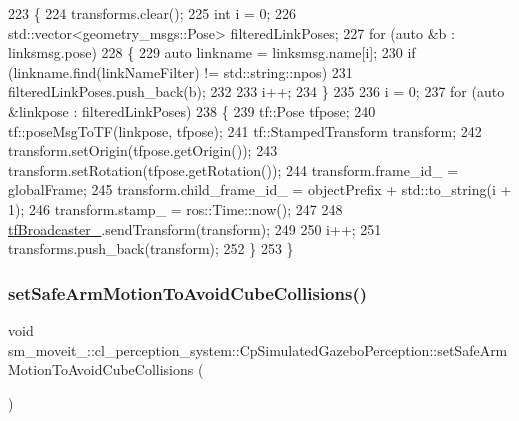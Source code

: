 \begin{DoxyCode}
223             \{
224                 transforms.clear();
225                 \textcolor{keywordtype}{int} i = 0;
226                 std::vector<geometry\_msgs::Pose> filteredLinkPoses;
227                 \textcolor{keywordflow}{for} (\textcolor{keyword}{auto} &b : linksmsg.pose)
228                 \{
229                     \textcolor{keyword}{auto} linkname = linksmsg.name[i];
230                     \textcolor{keywordflow}{if} (linkname.find(linkNameFilter) != std::string::npos)
231                         filteredLinkPoses.push\_back(b);
232 
233                     i++;
234                 \}
235 
236                 i = 0;
237                 \textcolor{keywordflow}{for} (\textcolor{keyword}{auto} &linkpose : filteredLinkPoses)
238                 \{
239                     tf::Pose tfpose;
240                     tf::poseMsgToTF(linkpose, tfpose);
241                     tf::StampedTransform transform;
242                     transform.setOrigin(tfpose.getOrigin());
243                     transform.setRotation(tfpose.getRotation());
244                     transform.frame\_id\_ = globalFrame;
245                     transform.child\_frame\_id\_ = objectPrefix + std::to\_string(i + 1);
246                     transform.stamp\_ = ros::Time::now();
247 
248                     \hyperlink{classsm__moveit__4_1_1cl__perception__system_1_1CpSimulatedGazeboPerception_a413594aa743f273c844795ff9f2f724b}{tfBroadcaster\_}.sendTransform(transform);
249 
250                     i++;
251                     transforms.push\_back(transform);
252                 \}
253             \}
\end{DoxyCode}
\mbox{\label{classsm__moveit__4_1_1cl__perception__system_1_1CpSimulatedGazeboPerception_af42b5a4e239fcac98a222c34115c9bc0}} 
\subsubsection{\texorpdfstring{set\+Safe\+Arm\+Motion\+To\+Avoid\+Cube\+Collisions()}{setSafeArmMotionToAvoidCubeCollisions()}}
{\footnotesize\ttfamily void sm\+\_\+moveit\+\_\+::cl\+\_\+perception\+\_\+system\+::\+Cp\+Simulated\+Gazebo\+Perception\+::set\+Safe\+Arm\+Motion\+To\+Avoid\+Cube\+Collisions (\begin{DoxyParamCaption}{ }\end{DoxyParamCaption})\hspace{0.3cm}{\ttfamily [inline]}}



